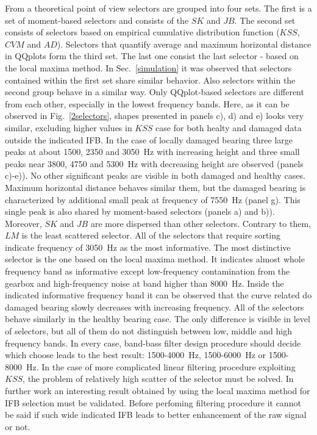 \documentclass[3p,times]{elsarticle}
\begin{document}
From a theoretical point of view selectors are grouped into four sets. The first is a set of moment-based selectors and consists of the $SK$ and $JB$. The second set consists of selectors based on empirical cumulative distribution function ($KSS$, $CVM$ and $AD$). Selectors that quantify average and maximum horizontal distance in QQplots form the third set. The last one consist the last selector - based on the local maxima method. In Sec.~\ref{simulation} it was observed that selectors contained within the first set share similar behavior. Also selectors within the second group behave in a similar way. Only QQplot-based selectors are different from each other, especially in the lowest frequency bands. Here, as it can be observed in Fig.~\ref{2selectors}, shapes presented in panels c), d) and e) looks very similar, excluding higher values in $KSS$ case for both healty and damaged data outside the indicated IFB. In the case of locally damaged bearing three large peaks at about 1500, 2350 and 3050~Hz with increasing height and three small peaks near 3800, 4750 and 5300~Hz with decreasing height are observed (panels c)-e)). No other significant peaks are visible in both damaged and healthy cases. Maximum horizontal distance behaves similar them, but the damaged bearing is characterized by additional small peak at frequency of 7550~Hz (panel g). This single peak is also shared by moment-based selectors (panels a) and b)). Moreover, $SK$ and $JB$ are more dispersed than other selectors. Contrary to them, $LM$ is the least scattered selector. All of the selectors that require sorting indicate frequency of 3050~Hz as the most informative. The most distinctive selector is the one based on the local maxima method. It indicates almost whole frequency band as informative except low-frequency contamination from the gearbox and high-frequency noise at band higher than 8000~Hz. Inside the indicated informative frequency band it can be observed that the curve related do damaged bearing slowly decreases with increasing frequency. All of the selectors behave similarly in the healthy bearing case. The only difference is visible in level of selectors, but all of them do not distinguish between low, middle and high frequency bands. In every case, band-bass filter design procedure should decide which choose leads to the best result: 1500-4000~Hz, 1500-6000~Hz or 1500-8000~Hz. In the case of more complicated linear filtering procedure exploiting $KSS$, the problem of relatively high scatter of the selector must be solved. In further work an interesting result obtained by using the local maxima method for IFB selection must be validated. Before perfoming filtering procedure it cannot be said if such wide indicated IFB leads to better enhancement of the raw signal or not.\\
\end{document}
